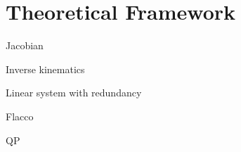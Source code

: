 \chapter{Theoretical Framework}
\label{theorychap}

Jacobian

Inverse kinematics

Linear system with redundancy

Flacco

QP